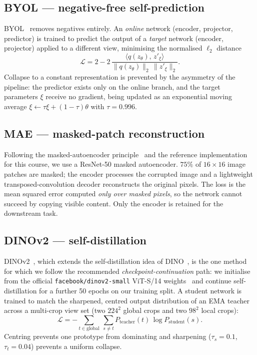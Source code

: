 \documentclass[conference]{IEEEtran}
\begin{document}
\subsection{BYOL --- negative-free self-prediction}
BYOL~\cite{byol} removes negatives entirely. An \emph{online} network (encoder, projector,
predictor) is trained to predict the output of a \emph{target} network (encoder,
projector) applied to a different view, minimising the normalised $\ell_2$ distance
\begin{equation}
\mathcal{L} = 2 - 2\,
\frac{\langle q(z_\theta),\, z'_{\xi}\rangle}
     {\lVert q(z_\theta)\rVert_2\,\lVert z'_{\xi}\rVert_2}.
\end{equation}
Collapse to a constant representation is prevented by the asymmetry of the pipeline:
the predictor exists only on the online branch, and the target parameters
$\xi$ receive no gradient, being updated as an exponential moving average
$\xi \leftarrow \tau\xi + (1-\tau)\theta$ with $\tau = 0.996$.

\subsection{MAE --- masked-patch reconstruction}
Following the masked-autoencoder principle~\cite{mae} and the reference implementation
for this course, we use a ResNet-50 masked autoencoder. $75\%$ of $16\times16$ image patches are masked; the encoder processes
the corrupted image and a lightweight transposed-convolution decoder reconstructs
the original pixels. The loss is the mean squared error computed \emph{only over
masked pixels}, so the network cannot succeed by copying visible content. Only the
encoder is retained for the downstream task.

\subsection{DINOv2 --- self-distillation}
DINOv2~\cite{dinov2}, which extends the self-distillation idea of DINO~\cite{dino}, is the
one method for which we follow the recommended
\emph{checkpoint-continuation} path: we initialise from the official
\texttt{facebook/dinov2-small} ViT-S/14 weights~\cite{hf} and continue self-distillation for a
further 50 epochs on our training split. A student network is trained to match the
sharpened, centred output distribution of an EMA teacher across a multi-crop view
set (two $224^2$ global crops and two $98^2$ local crops):
\begin{equation}
\mathcal{L} = -\sum_{t\in\text{global}}\ \sum_{s\neq t}
P_{\text{teacher}}(t)\,\log P_{\text{student}}(s).
\end{equation}
Centring prevents one prototype from dominating and sharpening
($\tau_s=0.1$, $\tau_t=0.04$) prevents a uniform collapse.
\end{document}
